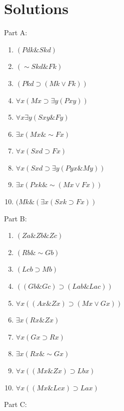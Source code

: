 \documentclass[
]{book}
\providecommand{\tightlist}{%
  \setlength{\itemsep}{0pt}\setlength{\parskip}{0pt}}
\begin{document}
\hypertarget{solutions-3}{%
\section{Solutions}\label{solutions-3}}

Part A:

\begin{enumerate}
\def\labelenumi{\arabic{enumi}.}
\tightlist
\item
  \((Pdk \& Skd)\)
\item
  \((\sim Skd \& Fk)\)
\item
  \((Pkd \supset (Mk \lor Fk))\)
\item
  \(\forall x(Mx \supset \exists y (Pxy))\)
\item
  \(\forall x\exists y (Sxy \& Fy)\)
\item
  \(\exists x(Mx \& \sim Fx)\)
\item
  \(\forall x(Sxd \supset Fx)\)
\item
  \(\forall x(Sxd \supset \exists y(Pyx \& My))\)
\item
  \(\exists x(Pxk \& \sim(Mx \lor Fx))\)
\item
  \((Mk \& (\exists x (Sxk \supset Fx))\)
\end{enumerate}

Part B:

\begin{enumerate}
\def\labelenumi{\arabic{enumi}.}
\tightlist
\item
  \((Za \& Zb \& Zc)\)
\item
  \((Rb \& \sim Gb)\)
\item
  \((Lcb \supset Mb)\)
\item
  \(((Gb \& Gc) \supset (Lab \& Lac))\)
\item
  \(\forall x((Ax \& Zx) \supset (Mx \lor Gx))\)
\item
  \(\exists x(Rx \& Zx)\)
\item
  \(\forall x(Gx \supset Rx)\)
\item
  \(\exists x(Rx \& \sim Gx)\)
\item
  \(\forall x((Mx \& Zx) \supset Lbx)\)
\item
  \(\forall x((Mx \& Lcx) \supset Lax)\)
\end{enumerate}

Part C:
\end{document}
